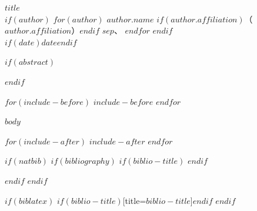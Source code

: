 \documentclass[12pt,a4paper]{ctexart}
\theoremstyle{definition}
\begin{document}
\setcounter{secnumdepth}{-1}

\begin{center}
{\LARGE\bfseries $title$}\\[0.8em]
$if(author)$
$for(author)$
$author.name$
$if(author.affiliation)$（$author.affiliation$）$endif$
$sep$、
$endfor$
$endif$
\\[0.5em]
$if(date)$$date$$endif$
\end{center}

$if(abstract)$
\begin{abstract}
$abstract$
\end{abstract}
$endif$

$for(include-before)$
$include-before$
$endfor$

$body$

$for(include-after)$
$include-after$
$endfor$

$if(natbib)$
$if(bibliography)$
$if(biblio-title)$
\renewcommand\refname{$biblio-title$}
$endif$
  
$endif$
$endif$

$if(biblatex)$
\printbibliography$if(biblio-title)$[title=$biblio-title$]$endif$
$endif$
\end{document}
